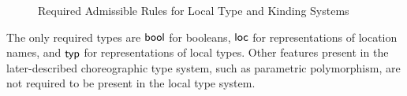 \begin{figure}
  \caption[Required Admissible Rules]{Required Admissible Rules for Local Type and Kinding Systems}
  \label{fig:local-type-rules}
\end{figure}

The only required types are $\mathsf{bool}$ for booleans, $\mathsf{loc}$ for representations of location names, and $\mathsf{typ}$ for representations of local types.
Other features present in the later-described choreographic type system, such as parametric polymorphism, are not required to be present in the local type system.


